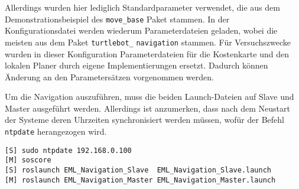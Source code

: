 Allerdings wurden hier lediglich Standardparameter verwendet, die aus dem Demonstrationsbeispiel des \lstinline{move_base}{} \cite{WikiMoveBase} Paket stammen. In der Konfigurationsdatei werden wiederum Parameterdateien geladen, wobei die meisten aus dem Paket \lstinline{turtlebot_} \lstinline{navigation}{} \cite{WikiTBNavigation} stammen. Für Versuchszwecke wurden in dieser Konfiguration Parameterdateien für die Kostenkarte und den lokalen Planer durch eigene Implementierungen ersetzt. Dadurch können Änderung an den Parametersätzen vorgenommen werden.

Um die Navigation auszuführen, muss die beiden Launch-Dateien auf Slave und Master ausgeführt werden. Allerdings ist anzumerken, dass nach dem Neustart der Systeme deren Uhrzeiten synchronisiert werden müssen, wofür der Befehl \lstinline{ntpdate}{} herangezogen wird.
\begin{lstlisting}[caption={Anleitung Navigation eines Roboters},captionpos=b]
[S] sudo ntpdate 192.168.0.100
[M] soscore
[S] roslaunch EML_Navigation_Slave  EML_Navigation_Slave.launch
[M] roslaunch EML_Navigation_Master EML_Navigation_Master.launch
\end{lstlisting}